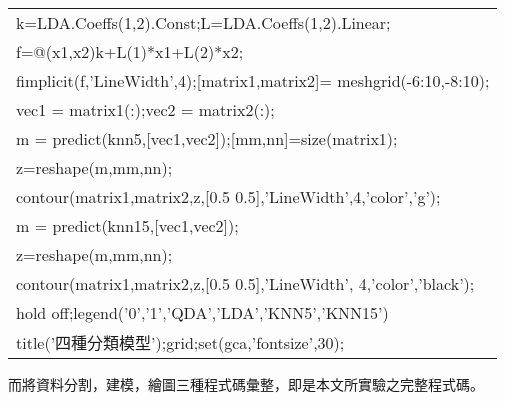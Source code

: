 \begin{enumerate}
{\begin{center}
{\begin{tabular}{p{}}
					k=LDA.Coeffs(1,2).Const;L=LDA.Coeffs(1,2).Linear;\\					
					f=@(x1,x2)k+L(1)*x1+L(2)*x2;\\
					fimplicit(f,'LineWidth',4);[matrix1,matrix2]=												meshgrid(-6:10,-8:10);\\

					
					vec1 = matrix1(:);vec2 = matrix2(:);\\					
					m = predict(knn5,[vec1,vec2]);[mm,nn]=size(matrix1);\\	
					z=reshape(m,mm,nn);\\
					contour(matrix1,matrix2,z,[0.5 0.5],'LineWidth',4,'color','g');\\

					m = predict(knn15,[vec1,vec2]);\\
					z=reshape(m,mm,nn);\\
					contour(matrix1,matrix2,z,[0.5 0.5],'LineWidth',											4,'color','black');\\

					hold off;legend('0','1','QDA','LDA','KNN5','KNN15')\\	
					title('四種分類模型');grid;set(gca,'fontsize',30);\\	
				\end{tabular}
			}
			\end{center}
			\bigskip
			而將資料分割，建模，繪圖三種程式碼彙整，即是本文所實驗之完整程式碼。
				
}
\end{enumerate}
